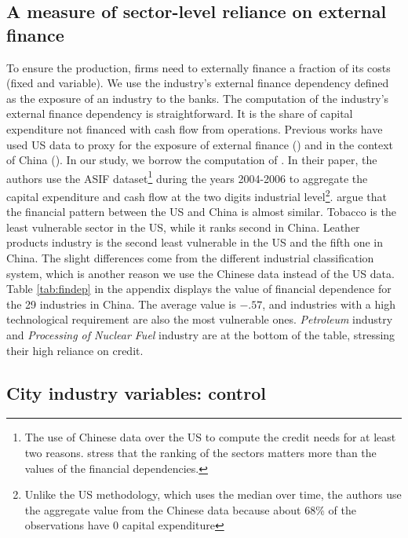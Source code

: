 \documentclass[12pt]{article}
\begin{document}
\subsection{A measure of sector-level reliance on external finance} \label{sec:fin}

To ensure the production, firms need to externally finance a fraction of its costs (fixed and variable). We use the industry’s external finance dependency defined as the exposure of an industry to the banks. The computation of the industry’s external finance dependency is straightforward. It is the share of capital expenditure not financed with cash flow from operations. Previous works have used US data to proxy for the exposure of external finance (\cite{Rajan1998-tn, Claessens2002-mj, Kroszner2007-gt}) and in the context of China (\cite{Jarreau2014-lb, Manova2015-zk, Fan2015-bm}). In our study, we borrow the computation of \cite{Fan2015-bm}. In their paper, the authors use the ASIF dataset\footnote{The use of Chinese data over the US to compute the credit needs for at least two reasons. \cite{Manova2015-zk} stress that the ranking of the sectors matters more than the values of the financial dependencies.} during the years 2004-2006 to aggregate the capital expenditure and cash flow at the two digits industrial level\footnote{Unlike the US methodology, which uses the median over time, the authors use the aggregate value from the Chinese data because about 68\% of the observations have 0 capital expenditure}. \cite{Fan2015-bm} argue that the financial pattern between the US and China is almost similar. Tobacco is the least vulnerable sector in the US, while it ranks second in China. Leather products industry is the second least vulnerable in the US and the fifth one in China. The slight differences come from the different industrial classification system, which is another reason we use the Chinese data instead of the US data. Table \ref{tab:findep} in the appendix displays the value of financial dependence for the 29 industries in China. The average value is $-.57$, and industries with a high technological requirement are also the most vulnerable ones. \textit{Petroleum} industry and \textit{Processing of Nuclear Fuel} industry are at the bottom of the table, stressing their high reliance on credit.

\subsection{City industry variables: control} \label{sec:control}
\end{document}
